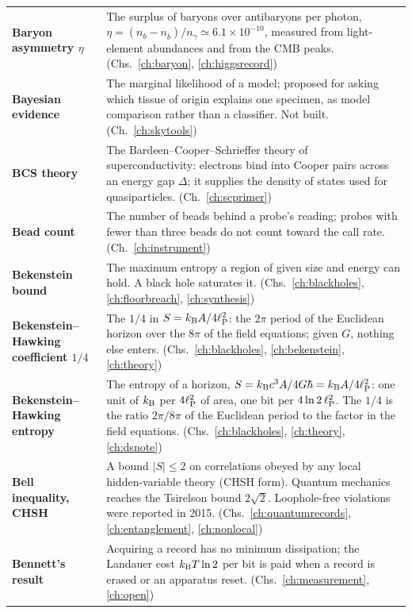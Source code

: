 {\begin{longtable}{@{}>{\raggedright\arraybackslash}p{}>{\raggedright\arraybackslash}p{}@{}}
\textbf{Baryon asymmetry $\eta$} & The surplus of baryons over antibaryons per photon, $\eta=(n_b-n_{\bar b})/n_\gamma\simeq6.1\times10^{-10}$, measured from light-element abundances and from the CMB peaks. {\footnotesize(Chs.~\ref{ch:baryon}, \ref{ch:higgsrecord})}\\[1pt]
\textbf{Bayesian evidence} & The marginal likelihood of a model; proposed for asking which tissue of origin explains one specimen, as model comparison rather than a classifier. Not built. {\footnotesize(Ch.~\ref{ch:skytools})}\\[1pt]
\textbf{BCS theory} & The Bardeen--Cooper--Schrieffer theory of superconductivity: electrons bind into Cooper pairs across an energy gap $\Delta$; it supplies the density of states used for quasiparticles. {\footnotesize(Ch.~\ref{ch:scprimer})}\\[1pt]
\textbf{Bead count} & The number of beads behind a probe's reading; probes with fewer than three beads do not count toward the call rate. {\footnotesize(Ch.~\ref{ch:instrument})}\\[1pt]
\textbf{Bekenstein bound} & The maximum entropy a region of given size and energy can hold. A black hole saturates it. {\footnotesize(Chs.~\ref{ch:blackholes}, \ref{ch:floorbreach}, \ref{ch:synthesis})}\\[1pt]
\textbf{Bekenstein--Hawking coefficient $1/4$} & The $1/4$ in $S=k_{\mathrm B} A/4\ell_{\mathrm P}^2$: the $2\pi$ period of the Euclidean horizon over the $8\pi$ of the field equations; given $G$, nothing else enters. {\footnotesize(Chs.~\ref{ch:blackholes}, \ref{ch:bekenstein}, \ref{ch:theory})}\\[1pt]
\textbf{Bekenstein--Hawking entropy} & The entropy of a horizon, $S=k_{\mathrm B} c^3A/4G\hbar=k_{\mathrm B} A/4\ell_{\mathrm P}^2$: one unit of $k_{\mathrm B}$ per $4\ell_{\mathrm P}^2$ of area, one bit per $4\ln2\,\ell_{\mathrm P}^2$. The $1/4$ is the ratio $2\pi/8\pi$ of the Euclidean period to the factor in the field equations. {\footnotesize(Chs.~\ref{ch:blackholes}, \ref{ch:theory}, \ref{ch:dsnote})}\\[1pt]
\textbf{Bell inequality, CHSH} & A bound $|S|\le2$ on correlations obeyed by any local hidden-variable theory (CHSH form). Quantum mechanics reaches the Tsirelson bound $2\sqrt2$. Loophole-free violations were reported in 2015. {\footnotesize(Chs.~\ref{ch:quantumrecords}, \ref{ch:entanglement}, \ref{ch:nonlocal})}\\[1pt]
\textbf{Bennett's result} & Acquiring a record has no minimum dissipation; the Landauer cost $k_{\mathrm B} T\ln2$ per bit is paid when a record is erased or an apparatus reset. {\footnotesize(Chs.~\ref{ch:measurement}, \ref{ch:open})}\\[1pt]

\end{longtable}}
